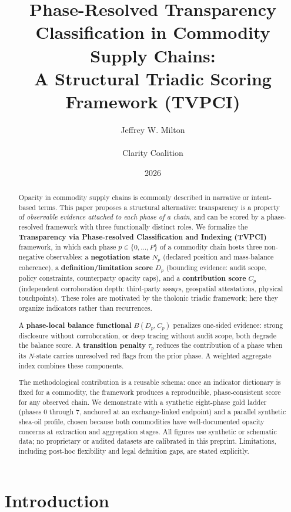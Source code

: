 \documentclass[12pt]{article}
\title{Phase-Resolved Transparency Classification in Commodity Supply Chains:\\
        \large A Structural Triadic Scoring Framework (TVPCI)}
\author{Jeffrey W. Milton\\\\[4pt]\small Clarity Coalition}
\date{2026}
\theoremstyle{remark}
\begin{document}
\maketitle

\begin{abstract}
Opacity in commodity supply chains is commonly described in narrative or intent-based terms.
This paper proposes a structural alternative: transparency is a property of
\emph{observable evidence attached to each phase of a chain}, and can be scored by a
phase-resolved framework with three functionally distinct roles.  We formalize the
\textbf{Transparency via Phase-resolved Classification and Indexing (TVPCI)} framework,
in which each phase $p \in \{0,\ldots,P\}$ of a commodity chain hosts three non-negative
observables: a \textbf{negotiation state} $N_p$ (declared position and mass-balance
coherence), a \textbf{definition/limitation score} $D_p$ (bounding evidence: audit scope,
policy constraints, counterparty opacity caps), and a \textbf{contribution score} $C_p$
(independent corroboration depth: third-party assays, geospatial attestations, physical
touchpoints).  These roles are motivated by the tholonic triadic framework; here they
organize indicators rather than recurrences.

A \textbf{phase-local balance functional} $B(D_p, C_p)$ penalizes one-sided evidence:
strong disclosure without corroboration, or deep tracing without audit scope, both degrade
the balance score.  A \textbf{transition penalty} $\tau_p$ reduces the contribution of a
phase when its $N$-state carries unresolved red flags from the prior phase.  A weighted
aggregate index combines these components.

The methodological contribution is a reusable schema: once an indicator dictionary is fixed
for a commodity, the framework produces a reproducible, phase-consistent score for any
observed chain.  We demonstrate with a synthetic eight-phase gold ladder (phases 0 through
7, anchored at an exchange-linked endpoint) and a parallel synthetic shea-oil profile,
chosen because both commodities have well-documented opacity concerns at extraction and
aggregation stages.  All figures use synthetic or schematic data; no proprietary or audited
datasets are calibrated in this preprint.  Limitations, including post-hoc flexibility and
legal definition gaps, are stated explicitly.
\end{abstract}

\tableofcontents

\section{Introduction}\label{sec:intro}
\end{document}
